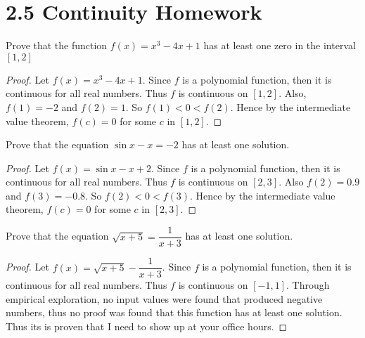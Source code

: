 \documentclass[12pt]{article}
\begin{document}
\section*{2.5 Continuity Homework}

Prove that the function $f(x) = x^3 - 4x +1$ has at least one zero in
the interval $[1,2]$

\begin{proof}
Let $f(x) = x^3 - 4x +1$. Since $f$ is a polynomial function, then it is
continuous for all real numbers. Thus $f$ is continuous on $[1,2]$.
Also, $f(1) = -2$ and $f(2) = 1$. So $f(1) < 0 < f(2)$. Hence by the intermediate value
theorem, $f(c) = 0$ for some $c$ in $[1,2]$.
\end{proof}

Prove that the equation $\sin x - x = -2$ has at least one solution.

\begin{proof}
Let $f(x) = \sin x - x + 2$. Since $f$ is a polynomial function, then it
is continuous for all real numbers. Thus $f$ is continuous on $[2,3]$.
Also $f(2) = 0.9$ and $f(3) = -0.8$. So $f(2) < 0 < f(3)$. Hence by
the intermediate value theorem, $f(c) = 0$ for some $c$ in $[2,3]$.
\end{proof}

Prove that the equation $\sqrt{x+5}=\dfrac{1}{x+3}$ has at least one
solution.

\begin{proof}
Let $f(x) = \sqrt{x+5} - \dfrac{1}{x+3}$. Since $f$ is a polynomial function, then it
is continuous for all real numbers. Thus $f$ is continuous on $[-1,1]$.
Through empirical exploration, no input values were found that
produced negative numbers, thus no proof was found that this function
has at least one solution. Thus its is proven that I need to show up at
your office hours.
\end{proof}
\end{document}
